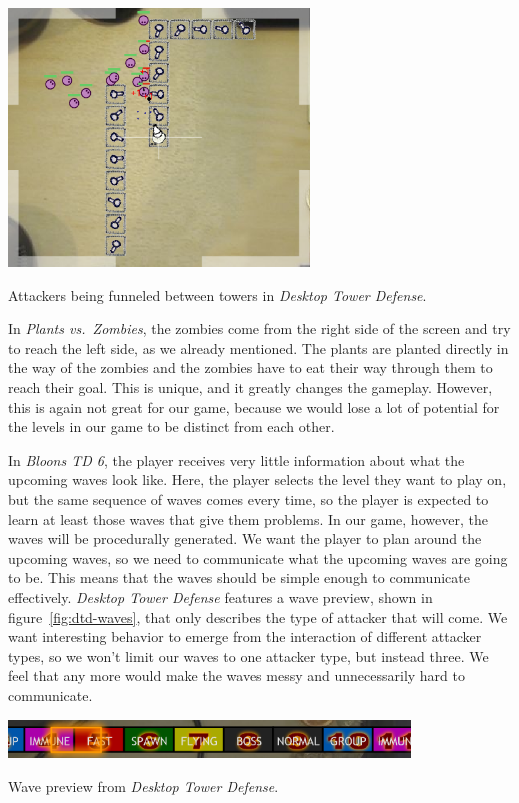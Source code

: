 \begin{center}
    \captionsetup{type=figure}
    \includegraphics[width=0.6\textwidth]{img/Desktop-Tower-Defense-Playfield.png}
    \caption{Attackers being funneled between towers in \emph{Desktop Tower Defense}.}
    \label{fig:dtd-pathfinding}
\end{center}

In \emph{Plants vs.\ Zombies}, the zombies come from the right side of the screen and try to reach the left side, as we already mentioned.
The plants are planted directly in the way of the zombies and the zombies have to eat their way through them to reach their goal.
This is unique, and it greatly changes the gameplay.
However, this is again not great for our game, because we would lose a lot of potential for the levels in our game to be distinct from each other.

In \emph{Bloons TD 6}, the player receives very little information about what the upcoming waves look like.
Here, the player selects the level they want to play on, but the same sequence of waves comes every time, so the player is expected to learn at least those waves that give them problems.
In our game, however, the waves will be procedurally generated.
We want the player to plan around the upcoming waves, so we need to communicate what the upcoming waves are going to be.
This means that the waves should be simple enough to communicate effectively.
\emph{Desktop Tower Defense} features a wave preview, shown in figure~\ref{fig:dtd-waves}, that only describes the type of attacker that will come.
We want interesting behavior to emerge from the interaction of different attacker types, so we won't limit our waves to one attacker type, but instead three.
We feel that any more would make the waves messy and unnecessarily hard to communicate.

\begin{center}
    \captionsetup{type=figure}
    \includegraphics[width=0.8\textwidth]{img/Desktop-Tower-Defense-Waves.png}
    \caption{Wave preview from \emph{Desktop Tower Defense}.}
    \label{fig:dtd-waves}
\end{center}


